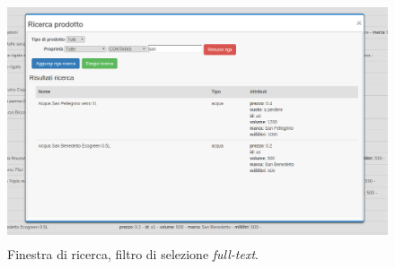 		\begin{figure}[H]
			\centering
			\includegraphics[height=7.1cm, width=\textwidth]{immagini/query-page-contains}
			\caption{Finestra di ricerca, filtro di selezione \textit{full-text}.}
		\end{figure}